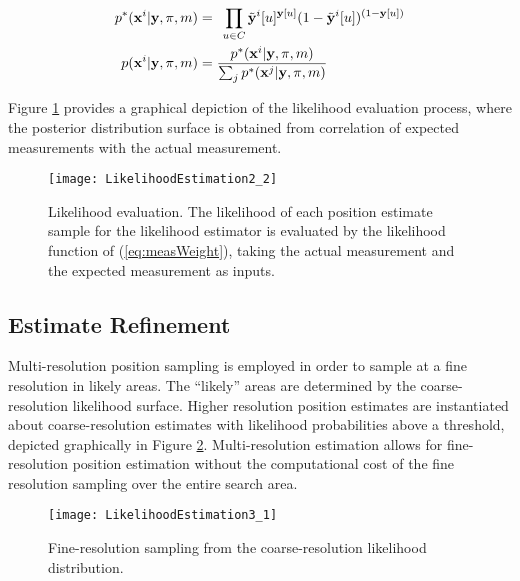 \begin{align}
\begin{split}
p^{*}(\mathbf{x}^{i} | \mathbf{y}, \mathbf{\pi}, m ) &= \hspace{1ex} \prod_{u \in C} \tilde{\mathbf{y}}^{i}[u]^{\mathbf{y}[u]} (1 - \tilde{\mathbf{y}}^{i}[u])^{(1 - \mathbf{y}[u])} \\
p(\mathbf{x}^{i} | \mathbf{y}, \mathbf{\pi}, m ) &= \frac{p^{*}(\mathbf{x}^{i} | \mathbf{y}, \mathbf{\pi}, m )}{\sum_j p^{*}(\mathbf{x}^{j} | \mathbf{y}, \mathbf{\pi}, m ) }
\end{split}
\label{eq:likelihood}
\end{align}


Figure \ref{fig:likelihood} provides a graphical depiction of the likelihood evaluation process, where the posterior distribution surface is obtained from correlation of expected measurements with the actual measurement.

\begin{figure}[!h]
	\centering
         \texttt{[image: LikelihoodEstimation2\_2]}
         \caption{Likelihood evaluation.  The likelihood of each position estimate sample for the likelihood estimator is evaluated by the likelihood function of (\ref{eq:measWeight}), taking the actual measurement and the expected measurement as inputs.}
	\label{fig:likelihood}
\end{figure}

\subsection{Estimate Refinement}
\label{framework.Motionless.Estimate}

Multi-resolution position sampling is employed in order to sample at a fine resolution in likely areas.
The ``likely'' areas are determined by the coarse-resolution likelihood surface.
Higher resolution position estimates are instantiated about coarse-resolution estimates with likelihood probabilities above a threshold, depicted graphically in Figure \ref{fig:fineSampling}.
Multi-resolution estimation allows for fine-resolution position estimation without the computational cost of the fine resolution sampling over the entire search area.

\begin{figure}[!h]
	\centering
         \texttt{[image: LikelihoodEstimation3\_1]}
         \caption{Fine-resolution sampling from the coarse-resolution likelihood distribution.}
	\label{fig:fineSampling}
\end{figure}

